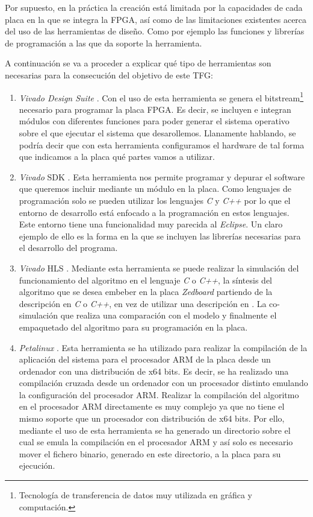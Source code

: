 Por supuesto, en la práctica la creación está limitada por la capacidades de cada placa en la que se integra la \ac{FPGA}, así como de las limitaciones existentes acerca del uso de las herramientas de diseño. Como por ejemplo las funciones y librerías de programación a las que da soporte la herramienta.

A continuación se va a proceder a explicar qué tipo de herramientas son necesarias para la consecución del objetivo de este \ac{TFG}:

\begin{enumerate}
\item \emph{Vivado Design Suite} \cite{VivadoDS}. Con el uso de esta herramienta se genera el bitstream\footnote{Tecnología de transferencia de datos muy utilizada en gráfica y computación.} necesario para programar la placa \ac{FPGA}. Es decir, se incluyen e integran módulos con diferentes funciones para poder generar el sistema operativo sobre el que ejecutar el sistema que desarollemos. Llanamente hablando, se podría decir que con esta herramienta configuramos el hardware de tal forma que indicamos a la placa qué partes vamos a utilizar.
\item \emph{Vivado} \ac{SDK} \cite{VivadoSDK}. Esta herramienta nos permite programar y depurar el software que queremos incluir mediante un módulo en la placa. Como lenguajes de programación solo se pueden utilizar los lenguajes \emph{C} y \emph{C++} por lo que el entorno de desarrollo está enfocado a la programación en estos lenguajes. Este entorno tiene una funcionalidad muy parecida al  \emph{Eclipse}. Un claro ejemplo de ello es la forma en la que se incluyen las librerías necesarias para el desarrollo del programa.
\item \emph{Vivado} \ac{HLS} \cite{VivadoHLS}. Mediante esta herramienta se puede realizar la simulación del funcionamiento del algoritmo en el lenguaje \emph{C} o \emph{C++}, la síntesis del algoritmo que se desea embeber en la placa \emph{Zedboard} partiendo de la descripción en \emph{C} o \emph{C++}, en vez de utilizar una descripción en . La co-simulación que realiza una comparación con el modelo  y finalmente el empaquetado del algoritmo para su programación en la placa. 
\item \emph{Petalinux} \cite{Petalinux}. Esta herramienta se ha utilizado para realizar la compilación de la aplicación del sistema para el procesador \ac{ARM} de la placa desde un ordenador con una distribución de x64 bits. Es decir, se ha realizado una compilación cruzada desde un ordenador con un procesador distinto emulando la configuración del procesador \ac{ARM}. Realizar la compilación del algoritmo en el procesador \ac{ARM} directamente es muy complejo ya que no tiene el mismo soporte que un procesador con distribución de x64 bits. Por ello, mediante el uso de esta herramienta se ha generado un directorio sobre el cual se emula la compilación en el procesador \ac{ARM} y así solo es necesario mover el fichero binario, generado en este directorio, a la placa para su ejecución.
\end{enumerate}
